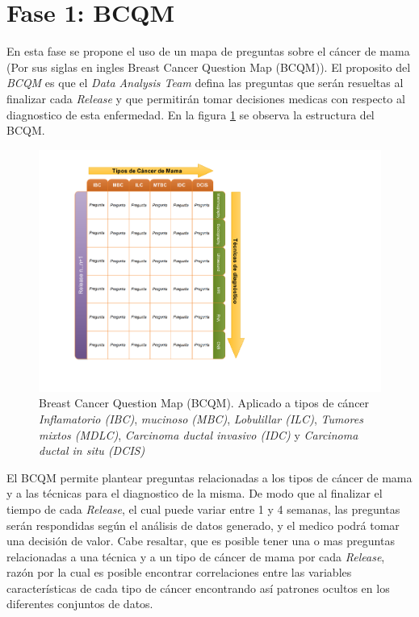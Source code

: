 \section{Fase 1: BCQM} 
En esta fase se propone el uso de un mapa de preguntas sobre el cáncer de mama (Por sus siglas en ingles Breast Cancer Question Map (BCQM)). El proposito del \textit{BCQM} es que el \textit{Data Analysis Team} defina las preguntas que serán resueltas al finalizar cada \textit{Release} y que permitirán tomar decisiones medicas con respecto al diagnostico de esta enfermedad. En la figura \ref{BCQM} se observa la estructura del BCQM.

\begin{figure}
	\centering
	\includegraphics[width=0.8
	\linewidth]{IMAGENES/BCQM_SPANISH}
	\caption{Breast Cancer Question Map (BCQM). Aplicado a tipos de cáncer \textit{Inflamatorio (IBC)}, \textit{mucinoso (MBC)}, \textit{Lobulillar (ILC)}, \textit{Tumores mixtos (MDLC)}, \textit{Carcinoma ductal invasivo (IDC)} y \textit{Carcinoma ductal in situ (DCIS)}}
	\label{BCQM}
\end{figure}

El BCQM permite plantear preguntas relacionadas a los tipos de cáncer de mama y a las técnicas para el diagnostico de la misma. De modo que al finalizar el tiempo de cada \textit{Release}, el cual puede variar entre 1 y 4 semanas, las preguntas serán respondidas según el análisis de datos generado, y el medico podrá tomar una decisión de valor. Cabe resaltar, que es posible tener una o mas preguntas relacionadas a una técnica y a un tipo de cáncer de mama por cada \textit{Release}, razón por la cual es posible encontrar correlaciones entre las variables características de cada tipo de cáncer encontrando así patrones ocultos en los diferentes conjuntos de datos.

